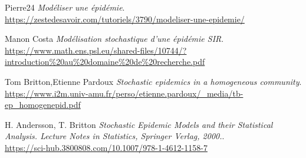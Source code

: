 \documentclass[11pt]{report}
\begin{document}
	
    \renewcommand{\bibname}{Bibliographie}
    
    \begin{thebibliography}{99} %
    \addto\captionsfrench{\renewcommand{\refname}{Bibliographie}}
	Pierre24
	\emph{Modéliser une épidémie}.\\
	\url{https://zestedesavoir.com/tutoriels/3790/modeliser-une-epidemie/}
	
	Manon Costa
	\emph{Modélisation stochastique d’une épidémie SIR}.\\
	\url{https://www.math.ens.psl.eu/shared-files/10744/?introduction%20au%20domaine%20de%20recherche.pdf}
	
	
	Tom Britton,Etienne Pardoux
	\emph{Stochastic epidemics in a homogeneous community}.\\
	\url{https://www.i2m.univ-amu.fr/perso/etienne.pardoux/_media/tb-ep_homogenepid.pdf}
	
	H. Andersson, T. Britton
	\emph{Stochastic Epidemic Models and their Statistical Analysis. Lecture Notes in Statistics, Springer Verlag, 2000.}.\\
	\url{https://sci-hub.3800808.com/10.1007/978-1-4612-1158-7}






	\end{thebibliography}
\end{document}
